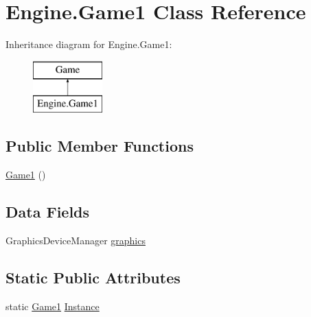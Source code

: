\hypertarget{a00040}{}\section{Engine.\+Game1 Class Reference}
\label{a00040}
Inheritance diagram for Engine.\+Game1\+:\begin{figure}[H]
\begin{center}
\leavevmode
\includegraphics[height=2.000000cm]{db/d3a/a00040}
\end{center}
\end{figure}
\subsection*{Public Member Functions}
\begin{DoxyCompactItemize}
\item 
\hyperlink{a00040_a321d836485b0e6ba049e1200dee17c3b}{Game1} ()
\end{DoxyCompactItemize}
\subsection*{Data Fields}
\begin{DoxyCompactItemize}
\item 
Graphics\+Device\+Manager \hyperlink{a00040_a6080a5540f79b78b6604cba45c3e0817}{graphics}
\end{DoxyCompactItemize}
\subsection*{Static Public Attributes}
\begin{DoxyCompactItemize}
\item 
static \hyperlink{a00040}{Game1} \hyperlink{a00040_a6edc487a30ce1f26309e430b29e25f72}{Instance}
\end{DoxyCompactItemize}
